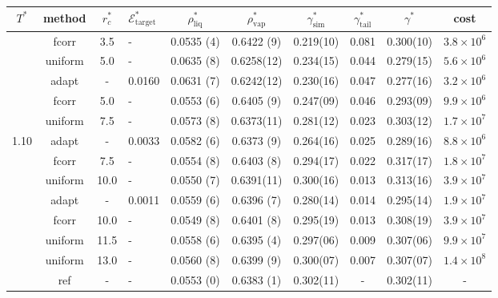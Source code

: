 \documentclass[aps,pre,preprint]{revtex4}
\begin{document}
\begin{table}
  \centering
  \begin{tabular*}{0.99\textwidth}{c|c|@{\extracolsep{\fill}}clcccccc}\hline\hline
    $T^\ast$ & \textrm{method} &$r^\ast_{c}$ & $\mathcal E^\ast_{\textrm{target}}$  & $\rho^\ast_{\textrm{liq}}$ & $\rho^\ast_{\textrm{vap}}$ & $\gamma^\ast_{\textrm{sim}}$ & $\gamma^\ast_{\textrm{tail}}$ & $\gamma^\ast$ & cost\\\hline
    & \textrm{fcorr}  & 3.5     & -       & 0.0535 (4) & 0.6422 (9) & 0.219(10) & 0.081 & 0.300(10) & $3.8\times 10^6$\\\cline{2-10}
    & \textrm{uniform}& 5.0     & -       & 0.0635 (8) & 0.6258(12) & 0.234(15) & 0.044 & 0.279(15) & $5.6\times 10^6$\\
    & \textrm{adapt}  & -       & 0.0160  & 0.0631 (7) & 0.6242(12) & 0.230(16) & 0.047 & 0.277(16) & $3.2\times 10^6$\\
    & \textrm{fcorr}  & 5.0     & -       & 0.0553 (6) & 0.6405 (9) & 0.247(09) & 0.046 & 0.293(09) & $9.9\times 10^6$\\\cline{2-10}
    & \textrm{uniform}& 7.5     & -       & 0.0573 (8) & 0.6373(11) & 0.281(12) & 0.023 & 0.303(12) & $1.7\times 10^7$\\
1.10& \textrm{adapt}  & -       & 0.0033  & 0.0582 (6) & 0.6373 (9) & 0.264(16) & 0.025 & 0.289(16) & $8.8\times 10^6$\\
    & \textrm{fcorr}  & 7.5     & -       & 0.0554 (8) & 0.6403 (8) & 0.294(17) & 0.022 & 0.317(17) & $1.8\times 10^7$\\\cline{2-10}
    & \textrm{uniform}& 10.0    & -       & 0.0550 (7) & 0.6391(11) & 0.300(16) & 0.013 & 0.313(16) & $3.9\times 10^7$\\
    & \textrm{adapt}  & -       & 0.0011  & 0.0559 (6) & 0.6396 (7) & 0.280(14) & 0.014 & 0.295(14) & $1.9\times 10^7$\\
    & \textrm{fcorr}  & 10.0    & -       & 0.0549 (8) & 0.6401 (8) & 0.295(19) & 0.013 & 0.308(19) & $3.9\times 10^7$\\\cline{2-10}
    & \textrm{uniform}& 11.5    & -       & 0.0558 (6) & 0.6395 (4) & 0.297(06) & 0.009 & 0.307(06) & $9.9\times 10^7$\\
    & \textrm{uniform}& 13.0    & -       & 0.0560 (8) & 0.6399 (9) & 0.300(07) & 0.007 & 0.307(07) & $1.4\times 10^8$\\\cline{2-10}
    & \textrm{ref}    & -       & -       & 0.0553 (0) & 0.6383 (1) & 0.302(11) & -     & 0.302(11) & - \\    \hline\hline

\end{tabular*}
\end{table}
\end{document}
